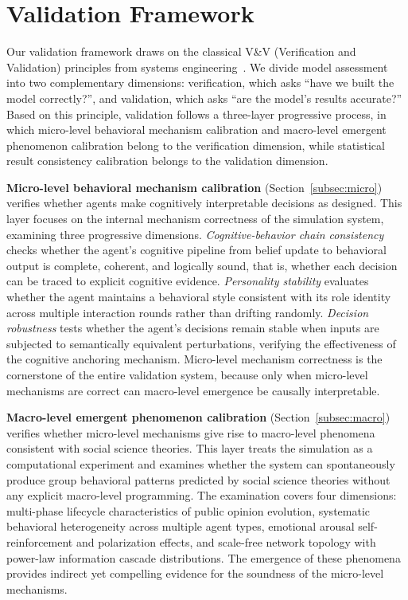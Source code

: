 \documentclass[a4paper,fleqn]{cas-dc}
\begin{document}
\section{Validation Framework}\label{sec:validation}

Our validation framework draws on the classical V\&V (Verification and Validation) principles from systems engineering~\citep{sargent_verification_2013}. We divide model assessment into two complementary dimensions: verification, which asks ``have we built the model correctly?'', and validation, which asks ``are the model's results accurate?'' Based on this principle, validation follows a three-layer progressive process, in which micro-level behavioral mechanism calibration and macro-level emergent phenomenon calibration belong to the verification dimension, while statistical result consistency calibration belongs to the validation dimension.

\textbf{Micro-level behavioral mechanism calibration} (Section~\ref{subsec:micro}) verifies whether agents make cognitively interpretable decisions as designed. This layer focuses on the internal mechanism correctness of the simulation system, examining three progressive dimensions. \textit{Cognitive-behavior chain consistency} checks whether the agent's cognitive pipeline from belief update to behavioral output is complete, coherent, and logically sound, that is, whether each decision can be traced to explicit cognitive evidence. \textit{Personality stability} evaluates whether the agent maintains a behavioral style consistent with its role identity across multiple interaction rounds rather than drifting randomly. \textit{Decision robustness} tests whether the agent's decisions remain stable when inputs are subjected to semantically equivalent perturbations, verifying the effectiveness of the cognitive anchoring mechanism. Micro-level mechanism correctness is the cornerstone of the entire validation system, because only when micro-level mechanisms are correct can macro-level emergence be causally interpretable.

\textbf{Macro-level emergent phenomenon calibration} (Section~\ref{subsec:macro}) verifies whether micro-level mechanisms give rise to macro-level phenomena consistent with social science theories. This layer treats the simulation as a computational experiment and examines whether the system can spontaneously produce group behavioral patterns predicted by social science theories without any explicit macro-level programming. The examination covers four dimensions: multi-phase lifecycle characteristics of public opinion evolution, systematic behavioral heterogeneity across multiple agent types, emotional arousal self-reinforcement and polarization effects, and scale-free network topology with power-law information cascade distributions. The emergence of these phenomena provides indirect yet compelling evidence for the soundness of the micro-level mechanisms.
\end{document}
